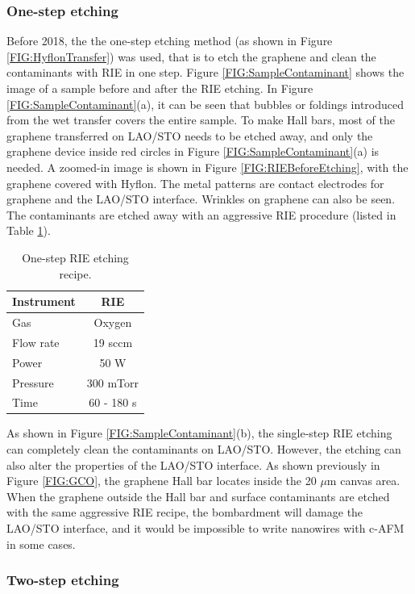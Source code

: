 \documentclass[pdflatex, sectionletters, 12pt]{pittetd}    %
\begin{document}
\subsubsection{One-step etching}

Before 2018, the the one-step etching method (as shown in Figure \ref{FIG:HyflonTransfer}) was used, that is to etch the graphene and clean the contaminants with RIE in one step. Figure \ref{FIG:SampleContaminant} shows the image of a sample before and after the RIE etching. In Figure \ref{FIG:SampleContaminant}(a), it can be seen that bubbles or foldings introduced from the wet transfer covers the entire sample. To make Hall bars, most of the graphene transferred on LAO/STO needs to be etched away, and only the graphene device inside red circles in Figure \ref{FIG:SampleContaminant}(a) is needed. A zoomed-in image is shown in Figure \ref{FIG:RIEBeforeEtching}, with the graphene covered with Hyflon. The metal patterns are contact electrodes for graphene and the LAO/STO interface. Wrinkles on graphene can also be seen. The contaminants are etched away with an aggressive RIE procedure (listed in Table \ref{TAB:RIESingleStep}). 

\begin{table}
	\centering
	\begin{tabular}{l|c}
		\hline
		Instrument    & RIE \\ \hline
		Gas    &    Oxygen \\ 
		Flow rate    &    19 sccm    \\ 
		Power & 50 W \\
		Pressure    &    300 mTorr    \\
		Time    &    60 - 180 s \\ \hline
	\end{tabular}
	\caption{One-step RIE etching recipe.}
	\label{TAB:RIESingleStep}
\end{table}

As shown in Figure \ref{FIG:SampleContaminant}(b), the single-step RIE etching can completely clean the contaminants on LAO/STO. However, the etching can also alter the properties of the LAO/STO interface. As shown previously in Figure \ref{FIG:GCO}, the graphene Hall bar locates inside the 20 $\mu$m canvas area. When the graphene outside the Hall bar and surface contaminants are etched with the same aggressive RIE recipe, the bombardment will damage the LAO/STO interface, and it would be impossible to write nanowires with c-AFM in some cases.

\subsubsection{Two-step etching}
\end{document}
